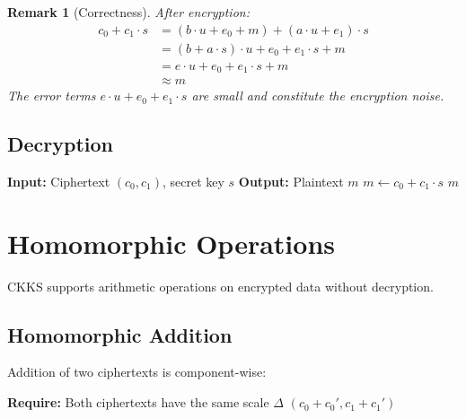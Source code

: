\documentclass[11pt,a4paper]{article}
\newtheorem{remark}{Remark}
\begin{document}
\begin{remark}[Correctness]
After encryption:
\begin{align*}
c_0 + c_1 \cdot s &= (b \cdot u + e_0 + m) + (a \cdot u + e_1) \cdot s \\
&= (b + a \cdot s) \cdot u + e_0 + e_1 \cdot s + m \\
&= e \cdot u + e_0 + e_1 \cdot s + m \\
&\approx m
\end{align*}
The error terms $e \cdot u + e_0 + e_1 \cdot s$ are small and constitute the encryption noise.
\end{remark}

\subsection{Decryption}

\begin{algorithm}[H]
\caption{CKKS Decryption}
\begin{algorithmic}[1]
    \State \textbf{Input:} Ciphertext $(c_0, c_1)$, secret key $s$
    \State \textbf{Output:} Plaintext $m$
    \State
    \State $m \gets c_0 + c_1 \cdot s$
    \State \Return $m$
\EndFunction
\end{algorithmic}
\end{algorithm}

\section{Homomorphic Operations}

CKKS supports arithmetic operations on encrypted data without decryption.

\subsection{Homomorphic Addition}

Addition of two ciphertexts is component-wise:

\begin{algorithm}[H]
\caption{Homomorphic Addition}
\begin{algorithmic}[1]
    \State \textbf{Require:} Both ciphertexts have the same scale $\Delta$
    \State \Return $(c_0 + c_0', c_1 + c_1')$
\EndFunction
\end{algorithmic}
\end{algorithm}
\end{document}
